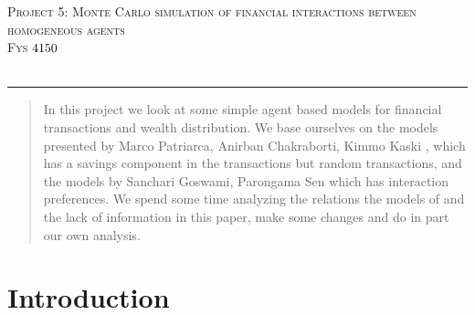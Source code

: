 \documentclass[a4paper,11pt]{article}
\newcommand*{\boisik}{\fontfamily{bsk}\selectfont} %
\begin{document}
{
\SetBgVshift{-1.2cm}
\SetBgHshift{-10.5cm}
$$\:$$
\begin{center}
	\vspace{0.2cm}%
	\fontsize{15}{15}\selectfont \textsc{ Project 5: Monte Carlo simulation of financial interactions between homogeneous agents}\\
	\fontsize{13}{13}\selectfont \textsc{Fys $\textnormal{{4150}}$ }\\
	\vspace{0.4cm}
	\fontsize{12}{12}\\
	\vspace{0.5cm}
\end{center}
	
\rule{\textwidth}{0.3pt}\par
		
\begin{abstract}
	In this project we look at some simple agent based models for financial transactions and wealth distribution. We base ourselves on the models presented by Marco Patriarca, Anirban Chakraborti, Kimmo Kaski \cite{GibbsVsnon-Gibbs}, which has a savings component in the transactions but random transactions, and the models by Sanchari Goswami, Parongama Sen \cite{AgentBasedModels} which has interaction preferences. We spend some time analyzing the relations the models of \cite{AgentBasedModels} and the lack of information in this paper, make some changes and do in part our own analysis.
	
\end{abstract}



		
\section*{Introduction}

}
\end{document}
